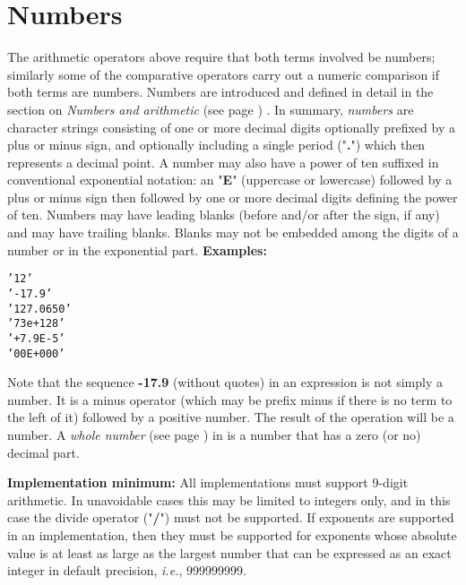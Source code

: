 \section{Numbers}\label{refnumdef}
 The arithmetic operators above require that both terms involved be
numbers; similarly some of the comparative operators carry out a
numeric comparison if both terms are numbers.
 Numbers are introduced and defined in detail in the section
on  \emph{Numbers and arithmetic} (see page \pageref{refnums}) .
In summary, \emph{numbers} are character strings consisting of one or
more decimal digits optionally prefixed by a plus or minus sign, and
optionally including a single period ("\textbf{.}") which then
represents a decimal point.
A number may also have a power of ten suffixed in conventional
exponential notation: an "\textbf{E}" (uppercase or lowercase)
followed by a plus or minus sign then followed by one or more decimal
digits defining the power of ten.
 Numbers may have leading blanks (before and/or after the sign, if
any) and may have trailing blanks.
Blanks may not be embedded among the digits of a number or in the
exponential part.
 \textbf{Examples:}
\begin{alltt}
'12'
'-17.9'
'127.0650'
'73e+128'
' + 7.9E-5 '
'00E+000'
\end{alltt}
 Note that the sequence \textbf{-17.9} (without quotes) in an
expression is not simply a number.
It is a minus operator (which may be prefix minus if there is no term
to the left of it) followed by a positive number.
The result of the operation will be a number.
 A  \emph{whole number} (see page \pageref{refwholed})  in \nr{} is a number
that has a zero (or no) decimal part.
 
\textbf{Implementation minimum:}
All implementations must support 9-digit arithmetic.
In unavoidable cases this may be limited to integers only, and in this
case the divide operator ("\textbf{/}") must not be supported.
If exponents are supported in an implementation, then they must be
supported for exponents whose absolute value is at least as large as the
largest number that can be expressed as an exact integer in default
precision, \emph{i.e.}, 999999999.
